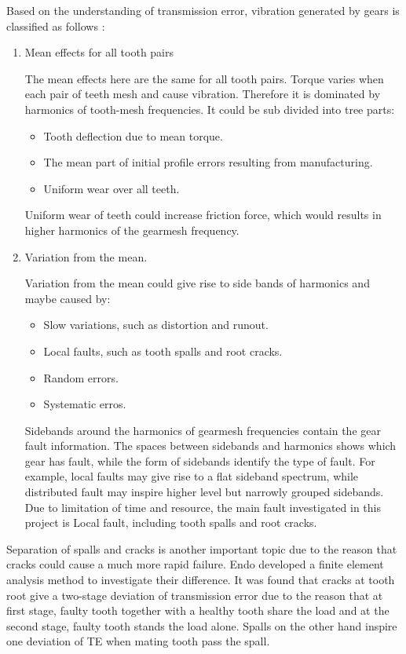 Based on the understanding of transmission error, vibration generated by gears is classified as follows \cite{vbcm}:
\begin{enumerate}
\item Mean effects for all tooth pairs

The mean effects here are the same for all tooth pairs. Torque varies when each pair of teeth mesh and cause vibration. Therefore it is dominated by harmonics of tooth-mesh frequencies. It could be sub divided into tree parts: 
\begin{itemize}
\item Tooth deflection due to mean torque.		
\item The mean part of initial profile errors resulting from manufacturing.		
\item Uniform wear over all teeth.
\end{itemize}
Uniform wear of teeth could increase friction force, which would results in higher harmonics of the gearmesh frequency.

\item Variation from the mean.

Variation from the mean could give rise to side bands of harmonics and maybe caused by:
\begin{itemize}
\item Slow variations, such as distortion and runout.		
\item Local faults, such as tooth spalls and root cracks.		
\item Random errors.		
\item Systematic erros.
\end{itemize}
Sidebands around the harmonics of gearmesh frequencies contain the gear fault information. The spaces between sidebands and harmonics shows which gear has fault, while the form of sidebands identify the type of fault. For example, local faults may give rise to a flat sideband spectrum, while distributed fault may inspire higher level but narrowly grouped sidebands. 
Due to limitation of time and resource, the main fault investigated in this project is Local fault, including tooth spalls and root cracks.
\end{enumerate}

Separation of spalls and cracks is another important topic due to the reason that cracks could cause a much more rapid failure. Endo \cite{Endo} developed a finite element analysis method to investigate their difference. It was found that cracks at tooth root give a two-stage deviation of transmission error due to the reason that at first stage, faulty tooth together with a healthy tooth share the load and at the second stage, faulty tooth stands the load alone. Spalls on the other hand inspire one deviation of TE when mating tooth pass the spall. 

